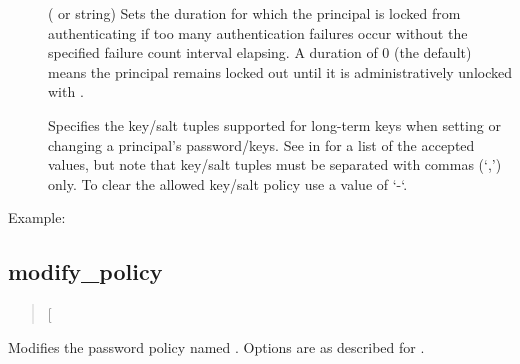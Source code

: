 \documentclass[letterpaper,10pt,english]{sphinxmanual}
\begin{document}
\label{\detokenize{admin/database:policy-lockoutduration}}\begin{description}
\item[{ }] \leavevmode
( or  string) Sets the duration for
which the principal is locked from authenticating if too many
authentication failures occur without the specified failure count
interval elapsing.  A duration of 0 (the default) means the
principal remains locked out until it is administratively unlocked
with .

\item[{}] \leavevmode
Specifies the key/salt tuples supported for long-term keys when
setting or changing a principal’s password/keys.  See
{\hyperref[\detokenize{admin/conf_files/kdc_conf:keysalt-lists}]{}} in {\hyperref[\detokenize{admin/conf_files/kdc_conf:kdc-conf-5}]{}} for a list of the
accepted values, but note that key/salt tuples must be separated
with commas (‘,’) only.  To clear the allowed key/salt policy use
a value of ‘-‘.

\end{description}

Example:

%
\begin{sphinxVerbatim}[commandchars=\\\{\}]
      
\end{sphinxVerbatim}


\subsection{modify\_policy}
\label{\detokenize{admin/database:modify-policy}}\begin{quote}

 {[}\sphinxstyleemphasis{options}{]} 
\end{quote}

Modifies the password policy named .  Options are as described
for .
\end{document}
